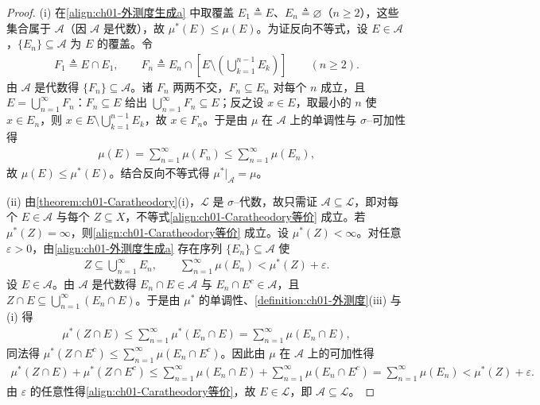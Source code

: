 \documentclass[../../main.tex]{subfiles}%
\begin{document}
\begin{proof}
(i) 在\eqref{align:ch01-外测度生成a} 中取覆盖 $E_1\triangleq E$、$E_n\triangleq\varnothing$（$n\geqslant 2$），这些集合属于 $\mathcal{A}$（因 $\mathcal{A}$ 是代数），故 $\mu^*(E)\leqslant\mu(E)$。为证反向不等式，设 $E\in\mathcal{A}$，$\{E_n\}\subseteq\mathcal{A}$ 为 $E$ 的覆盖。令
\begin{align*}
F_1\triangleq E\cap E_1,\qquad F_n\triangleq E_n\cap\left[E\setminus\left(\bigcup_{k=1}^{n-1}E_k\right)\right]\qquad(n\geqslant 2).
\end{align*}
由 $\mathcal{A}$ 是代数得 $\{F_n\}\subseteq\mathcal{A}$。诸 $F_n$ 两两不交，$F_n\subseteq E_n$ 对每个 $n$ 成立，且 $E=\bigcup_{n=1}^\infty F_n$：$F_n\subseteq E$ 给出 $\bigcup_{n=1}^\infty F_n\subseteq E$；反之设 $x\in E$，取最小的 $n$ 使 $x\in E_n$，则 $x\in E\setminus\bigcup_{k=1}^{n-1}E_k$，故 $x\in F_n$。于是由 $\mu$ 在 $\mathcal{A}$ 上的单调性与 $\sigma$--可加性得
\begin{align*}
\mu(E)=\sum_{n=1}^\infty\mu(F_n)\leqslant\sum_{n=1}^\infty\mu(E_n),
\end{align*}
故 $\mu(E)\leqslant\mu^*(E)$。结合反向不等式得 $\mu^*|_{\mathcal{A}}=\mu$。

(ii) 由\cref{theorem:ch01-Caratheodory}(i)，$\mathcal{L}$ 是 $\sigma$--代数，故只需证 $\mathcal{A}\subseteq\mathcal{L}$，即对每个 $E\in\mathcal{A}$ 与每个 $Z\subseteq X$，不等式\eqref{align:ch01-Caratheodory等价} 成立。若 $\mu^*(Z)=\infty$，则\eqref{align:ch01-Caratheodory等价} 成立。设 $\mu^*(Z)<\infty$。对任意 $\varepsilon>0$，由\eqref{align:ch01-外测度生成a} 存在序列 $\{E_n\}\subseteq\mathcal{A}$ 使
\begin{align*}
Z\subseteq\bigcup_{n=1}^\infty E_n,\qquad\sum_{n=1}^\infty\mu(E_n)<\mu^*(Z)+\varepsilon.
\end{align*}
设 $E\in\mathcal{A}$。由 $\mathcal{A}$ 是代数得 $E_n\cap E\in\mathcal{A}$ 与 $E_n\cap E^c\in\mathcal{A}$，且 $Z\cap E\subseteq\bigcup_{n=1}^\infty(E_n\cap E)$。于是由 $\mu^*$ 的单调性、\cref{definition:ch01-外测度}(iii) 与 (i) 得
\begin{align*}
\mu^*(Z\cap E)\leqslant\sum_{n=1}^\infty\mu^*(E_n\cap E)=\sum_{n=1}^\infty\mu(E_n\cap E),
\end{align*}
同法得 $\mu^*(Z\cap E^c)\leqslant\sum_{n=1}^\infty\mu(E_n\cap E^c)$。因此由 $\mu$ 在 $\mathcal{A}$ 上的可加性得
\begin{align*}
\mu^*(Z\cap E)+\mu^*(Z\cap E^c)\leqslant\sum_{n=1}^\infty\mu(E_n\cap E)+\sum_{n=1}^\infty\mu(E_n\cap E^c)=\sum_{n=1}^\infty\mu(E_n)<\mu^*(Z)+\varepsilon.
\end{align*}
由 $\varepsilon$ 的任意性得\eqref{align:ch01-Caratheodory等价}，故 $E\in\mathcal{L}$，即 $\mathcal{A}\subseteq\mathcal{L}$。


\end{proof}
\end{document}

